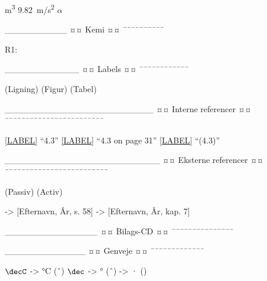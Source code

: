 \si{m^3}
\SI{9,82}{m/s^2}
$\alpha$

__________
¤¤ Kemi ¤¤
¯¯¯¯¯¯¯¯¯¯




R1: 

____________
¤¤ Labels ¤¤
¯¯¯¯¯¯¯¯¯¯¯¯

\label{eq:...} 		(Ligning)
\label{fig:...} 	(Figur)
\label{tab:...} 	(Tabel)


________________________
¤¤ Interne referencer ¤¤
¯¯¯¯¯¯¯¯¯¯¯¯¯¯¯¯¯¯¯¯¯¯¯¯

\ref{LABEL} 		“4.3”
\vref{LABEL} 		“4.3 on page 31”
\eqref{LABEL} 		“(4.3)”

_________________________
¤¤ Eksterne referencer ¤¤
¯¯¯¯¯¯¯¯¯¯¯¯¯¯¯¯¯¯¯¯¯¯¯¯¯

\citep{LABEL} 		(Passiv)
\citet{LABEL} 		(Activ)

\citep[ SIDE, AFSNIT, KAPITEL MV.]{LABEL}

\citep[ s. 58]{fysikbog} 		->		[Efternavn, År, s. 58]
\citep[ kap. 7]{fysikbog} 		->		[Efternavn, År, kap. 7]


_______________
¤¤ Bilags-CD ¤¤
¯¯¯¯¯¯¯¯¯¯¯¯¯¯¯

\citep[ FILNAVN]{cd}


_____________
¤¤ Genveje ¤¤
¯¯¯¯¯¯¯¯¯¯¯¯¯

$\decC$ 		->		°C 		(ˆ{\circ})
$\dec$ 			->		° 		(ˆ{\circ})
\m 				->		· 		(\cdot)

